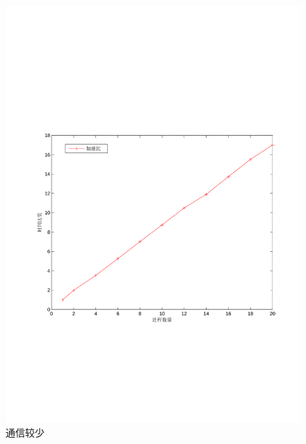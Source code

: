 \documentclass[UTF8]{ctexart}
\begin{document}
\begin{figure}[!htbp]
  \begin{minipage}[t]{0.5\linewidth}
    \centering
    \includegraphics[width=\textwidth]{fig/fig06.pdf}
    \caption{通信较少 \label{sec4:subsec3:fg1}}
  \end{minipage}
  \hfill
  \begin{minipage}[t]{0.5\linewidth}
    \centering

\end{minipage}
\end{figure}
\end{document}
